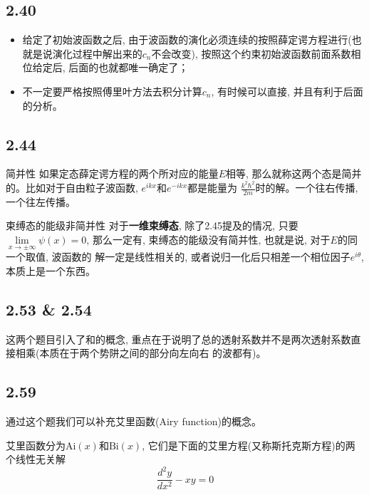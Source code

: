\documentclass[a4paper,zihao=-4,linespread=1]{ctexrep}
\begin{document}
    \subsection*{2.40}
    \begin{itemize}
        \item 给定了初始波函数之后, 由于波函数的演化必须连续的按照薛定谔方程进行(也就是说演化过程中解出来的$c_n$不会改变), 按照这个约束初始波函数前面系数相位给定后, 后面的也就都唯一确定了；
        \item 不一定要严格按照傅里叶方法去积分计算$c_n$, 有时候可以直接, 并且有利于后面的分析。
    \end{itemize}
    \subsection*{2.44}
    \begin{define}{简并性}
        如果定态薛定谔方程的两个所对应的能量$E$相等, 那么就称这两个态是简并的。比如对于自由粒子波函数, $e^{ikx}$和$e^{-ikx}$都是能量为
        $\frac{k^2\hbar^2}{2m}$时的解。一个往右传播, 一个往左传播。
    \end{define}
    \begin{theorem}{束缚态的能级非简并性}
        对于\textbf{一维束缚态}, 除了2.45提及的情况, 只要$\lim\limits_{x\to\pm\infty}\psi(x)=0$, 那么一定有, 束缚态的能级没有简并性, 也就是说, 对于$E$的同一个取值, 波函数的
        解一定是线性相关的, 或者说归一化后只相差一个相位因子$e^{i\theta}$, 本质上是一个东西。
    \end{theorem}
    \subsection*{2.53 \& 2.54}
    这两个题目引入了和的概念, 重点在于说明了总的透射系数并不是两次透射系数直接相乘(本质在于两个势阱之间的部分向左向右
    的波都有)。
    \subsection*{2.59}
    通过这个题我们可以补充艾里函数(Airy function)的概念。

    艾里函数分为$\mathrm{Ai}(x)$和$\mathrm{Bi}(x)$, 它们是下面的艾里方程(又称斯托克斯方程)的两个线性无关解
    $$\frac{d^2y}{dx^2}-xy=0$$
\end{document}
